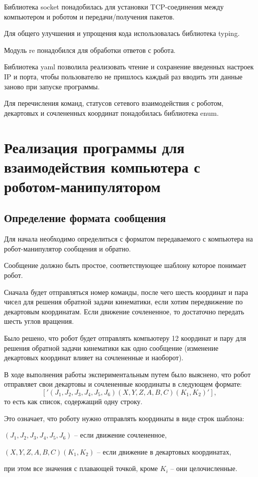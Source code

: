 \documentclass[a4paper,14pt]{extarticle}
\begin{document}
Библиотека socket понадобилась для установки TCP-соединения между компьютером и роботом
и передачи/получения пакетов.


Для общего улучшения и упрощения кода использовалась
библиотека typing.


Модуль re понадобился для обработки ответов с робота.


Библиотека
yaml позволила реализовать чтение и сохранение введенных настроек IP и порта, чтобы
пользователю не пришлось каждый раз вводить эти данные заново при запуске программы.


Для перечисления команд, статусов сетевого взаимодействия с роботом,
декартовых и сочлененных координат понадобилась библиотека enum.


\section{Реализация программы для взаимодействия компьютера с роботом-манипулятором}
\subsection{Определение формата сообщения}
Для начала необходимо определиться
с форматом передаваемого с компьютера
на робот-манипулятор сообщения и обратно.


Сообщение должно быть простое, соответствующее
шаблону которое понимает робот.


Сначала будет отправляться номер команды, после чего
шесть координат и пара чисел для решения
обратной задачи кинематики, если хотим
передвижение по декартовым координатам.
Если движение сочлененное, то достаточно
передать шесть углов вращения.


Было решено, что робот будет отправлять компьютеру
12 координат и пару для решения обратной задачи кинематики
как одно сообщение (изменение декартовых координат влияет на сочлененные и наоборот).


В ходе выполнения работы экспериментальным путем было выяснено, что
робот отправляет свои декартовы и сочлененные координаты
в следующем формате:
$$
['(J_1,J_2,J_3,J_4,J_5,J_6)(X,Y,Z,A,B,C)(K_1,K_2)'],
$$
то есть как список, содержащий одну строку.


Это означает, что роботу нужно отправлять
координаты в виде строк шаблона:
\begin{compactitem}
    \item $(J_1,J_2,J_3,J_4,J_5,J_6)$ -- если движение сочлененное,
    \item $(X,Y,Z,A,B,C)(K_1,K_2)$ -- если движение в декартовых координатах,
\end{compactitem}
при этом все значения с плавающей точкой, кроме $K_i$ -- они целочисленные.
\end{document}
